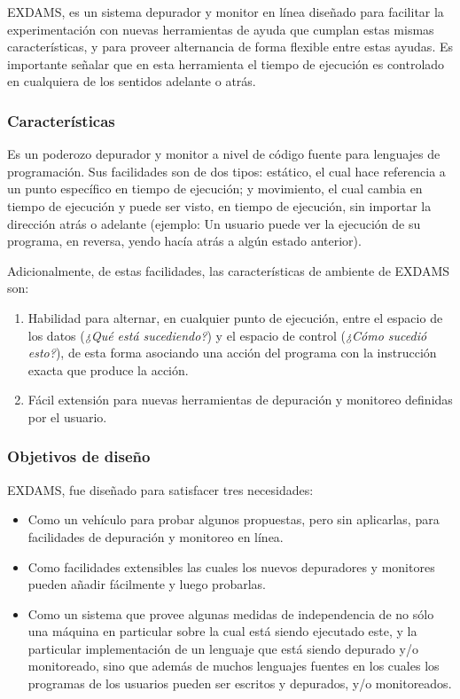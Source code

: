 \documentclass[12pt,legalpaper]{report}
\begin{document}
EXDAMS, es un sistema depurador y monitor en línea diseñado para facilitar la experimentación con nuevas herramientas de ayuda que cumplan estas mismas características, y para proveer alternancia de forma flexible entre estas ayudas.  Es importante señalar que en esta herramienta el tiempo de ejecución es controlado en cualquiera de los sentidos adelante o atrás.

			\subsubsection{Características}

Es un poderozo depurador y monitor a nivel de código fuente para lenguajes de programación.  Sus facilidades son de dos tipos: estático, el cual hace referencia a un punto específico en tiempo de ejecución; y movimiento, el cual cambia en tiempo de ejecución y puede ser visto, en tiempo de ejecución, sin importar la dirección atrás o adelante (ejemplo: Un usuario puede ver la ejecución de su programa, en reversa, yendo hacía atrás a algún estado anterior).

Adicionalmente, de estas facilidades, las características de ambiente de EXDAMS son:
\begin{enumerate}
	\item Habilidad para alternar, en cualquier punto de ejecución, entre el espacio de los datos (\textit{¿Qué está sucediendo?}) y el espacio de control (\textit{¿Cómo sucedió esto?}), de esta forma asociando una acción del programa con la instrucción exacta que produce la acción.

	\item Fácil extensión para nuevas herramientas de depuración y monitoreo definidas por el usuario.
\end{enumerate} 

			\subsubsection{Objetivos de diseño}

EXDAMS, fue diseñado para satisfacer tres necesidades:
\begin{itemize}
	\item Como un vehículo para probar algunos propuestas, pero sin aplicarlas, para facilidades de depuración y monitoreo en línea.

	\item Como facilidades extensibles las cuales los nuevos depuradores y monitores pueden añadir fácilmente y luego probarlas.

	\item Como un sistema que provee algunas medidas de independencia de no sólo una máquina en particular sobre la cual está siendo ejecutado este, y la particular implementación de un lenguaje que está siendo depurado y/o monitoreado, sino que además de muchos lenguajes fuentes en los cuales los programas de los usuarios pueden ser escritos y depurados, y/o monitoreados.
\end{itemize}
\end{document}

